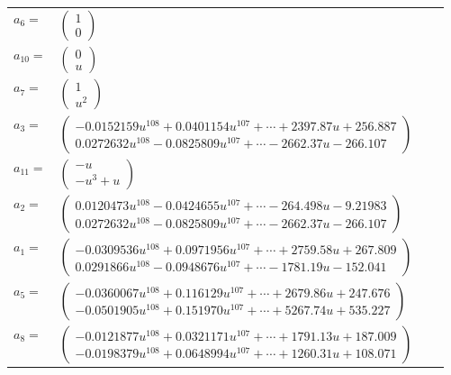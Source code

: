 \documentclass[1p]{elsarticle_modified}
\theoremstyle{definition}
\begin{document}
\begin{tabular}{m{7pt} m{180pt} m{7pt} m{180pt} }
\flushright $a_{6}=$&$\begin{pmatrix}1\\0\end{pmatrix}$ \\
\flushright $a_{10}=$&$\begin{pmatrix}0\\u\end{pmatrix}$ \\
\flushright $a_{7}=$&$\begin{pmatrix}1\\u^2\end{pmatrix}$ \\
\flushright $a_{3}=$&$\begin{pmatrix}-0.0152159 u^{108}+0.0401154 u^{107}+\cdots+2397.87 u+256.887\\0.0272632 u^{108}-0.0825809 u^{107}+\cdots-2662.37 u-266.107\end{pmatrix}$ \\
\flushright $a_{11}=$&$\begin{pmatrix}- u\\- u^3+u\end{pmatrix}$ \\
\flushright $a_{2}=$&$\begin{pmatrix}0.0120473 u^{108}-0.0424655 u^{107}+\cdots-264.498 u-9.21983\\0.0272632 u^{108}-0.0825809 u^{107}+\cdots-2662.37 u-266.107\end{pmatrix}$ \\
\flushright $a_{1}=$&$\begin{pmatrix}-0.0309536 u^{108}+0.0971956 u^{107}+\cdots+2759.58 u+267.809\\0.0291866 u^{108}-0.0948676 u^{107}+\cdots-1781.19 u-152.041\end{pmatrix}$ \\
\flushright $a_{5}=$&$\begin{pmatrix}-0.0360067 u^{108}+0.116129 u^{107}+\cdots+2679.86 u+247.676\\-0.0501905 u^{108}+0.151970 u^{107}+\cdots+5267.74 u+535.227\end{pmatrix}$ \\
\flushright $a_{8}=$&$\begin{pmatrix}-0.0121877 u^{108}+0.0321171 u^{107}+\cdots+1791.13 u+187.009\\-0.0198379 u^{108}+0.0648994 u^{107}+\cdots+1260.31 u+108.071\end{pmatrix}$ \\

\end{tabular}
\end{document}
